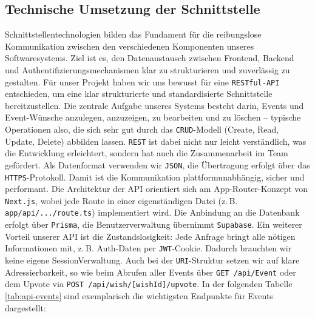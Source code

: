 \documentclass[a4paper,12pt]{article}
\begin{document}
\subsection{Technische Umsetzung der Schnittstelle}
Schnitt\-stellen\-technologien bilden das Fundament für die reibungslose Kommunikation zwischen den verschiedenen Komponenten unseres Software\-systems. Ziel ist es, den Daten\-austausch zwischen Frontend, Backend und Authentifizierungs\-mechanismen klar zu strukturieren und zuverlässig zu gestalten. Für unser Projekt haben wir uns bewusst für eine \texttt{RESTful-API} entschieden, um eine klar strukturierte und standardisierte Schnittstelle bereitzustellen. Die zentrale Aufgabe unseres Systems besteht darin, Events und Event-Wünsche anzulegen, anzuzeigen, zu bearbeiten und zu löschen – typische Operationen also, die sich sehr gut durch das \texttt{\gls{CRUD}}-Modell (Create, Read, Update, Delete) abbilden lassen. \texttt{\gls{REST}} ist dabei nicht nur leicht verständlich, was die Entwicklung erleichtert, sondern hat auch die Zusammenarbeit im Team gefördert. Als Datenformat verwenden wir \texttt{JSON}, die Übertragung erfolgt über das \texttt{HTTPS}-Protokoll. Damit ist die Kommunikation platt\-form\-unabhängig, sicher und performant. Die Architektur der API orientiert sich am App-Router-Konzept von \mbox{\texttt{Next.js}}, wobei jede Route in einer eigenständigen Datei (z.\,B. \mbox{\texttt{app/api/.../route.ts}}) implementiert wird. Die Anbindung an die Datenbank erfolgt über \texttt{\gls{Prisma}}, die Benutzer\-verwaltung übernimmt \texttt{Supabase}. Ein weiterer Vorteil unserer API ist die Zustands\-losigkeit: Jede Anfrage bringt alle nötigen Informationen mit, z.\,B. Auth-Daten per \texttt{\gls{JWT}}-Cookie. Dadurch brauchten wir keine eigene Session\-Verwaltung. Auch bei der \texttt{URI}-Struktur setzen wir auf klare Adressierbarkeit, so wie beim Abrufen aller Events über \mbox{\texttt{GET /api/Event}} oder dem Upvote via \mbox{\texttt{POST /api/wish/[wishId]/upvote}}. In der folgenden Tabelle \ref{tab:api-events} sind exemplarisch die wichtigsten Endpunkte für Events dargestellt:
\end{document}
